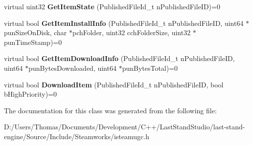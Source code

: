 \begin{DoxyCompactItemize}
\item 
\hypertarget{classISteamUGC_abae9114b1aa2460e5f4241b218f51329}{}virtual uint32 {\bfseries Get\+Item\+State} (Published\+File\+Id\+\_\+t n\+Published\+File\+I\+D)=0\label{classISteamUGC_abae9114b1aa2460e5f4241b218f51329}

\item 
\hypertarget{classISteamUGC_a30a19c997a1b95af49174750ce36c998}{}virtual bool {\bfseries Get\+Item\+Install\+Info} (Published\+File\+Id\+\_\+t n\+Published\+File\+I\+D, uint64 $\ast$pun\+Size\+On\+Disk, char $\ast$pch\+Folder, uint32 cch\+Folder\+Size, uint32 $\ast$pun\+Time\+Stamp)=0\label{classISteamUGC_a30a19c997a1b95af49174750ce36c998}

\item 
\hypertarget{classISteamUGC_a0ef7718b82b39ff366f42900d0ab84c8}{}virtual bool {\bfseries Get\+Item\+Download\+Info} (Published\+File\+Id\+\_\+t n\+Published\+File\+I\+D, uint64 $\ast$pun\+Bytes\+Downloaded, uint64 $\ast$pun\+Bytes\+Total)=0\label{classISteamUGC_a0ef7718b82b39ff366f42900d0ab84c8}

\item 
\hypertarget{classISteamUGC_a462e4a1a9ae99b51eb2458fe4b5c415b}{}virtual bool {\bfseries Download\+Item} (Published\+File\+Id\+\_\+t n\+Published\+File\+I\+D, bool b\+High\+Priority)=0\label{classISteamUGC_a462e4a1a9ae99b51eb2458fe4b5c415b}

\end{DoxyCompactItemize}


The documentation for this class was generated from the following file\+:\begin{DoxyCompactItemize}
\item 
D\+:/\+Users/\+Thomas/\+Documents/\+Development/\+C++/\+Last\+Stand\+Studio/last-\/stand-\/engine/\+Source/\+Include/\+Steamworks/isteamugc.\+h\end{DoxyCompactItemize}
